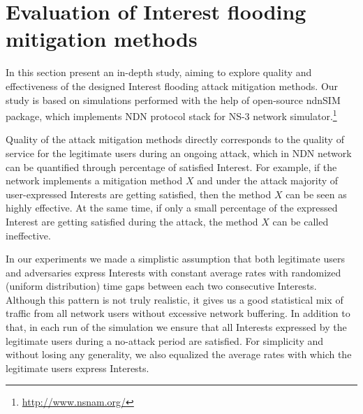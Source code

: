 \section{Evaluation of Interest flooding mitigation methods}
\label{sec:evaluation}




In this section present an in-depth study, aiming to explore quality and effectiveness of the designed Interest flooding attack mitigation methods.
Our study is based on simulations performed with the help of open-source ndnSIM~\cite{ndnsim} package, which implements NDN protocol stack for NS-3 network simulator.\footnote{\url{http://www.nsnam.org/}}


Quality of the attack mitigation methods directly corresponds to the quality of service for the legitimate users during an ongoing attack, which in NDN network can be quantified through percentage of satisfied Interest.
For example, if the network implements a mitigation method $X$ and under the attack majority of user-expressed Interests are getting satisfied, then the method $X$ can be seen as highly effective.
At the same time, if only a small percentage of the expressed Interest are getting satisfied during the attack, the method $X$ can be called ineffective. 


In our experiments we made a simplistic assumption that both legitimate users and adversaries express Interests with constant average rates with randomized (uniform distribution) time gaps between each two consecutive Interests.
Although this pattern is not truly realistic, it gives us a good statistical mix of traffic from all network users without excessive network buffering.
In addition to that, in each run of the simulation we ensure that all Interests expressed by the legitimate users during a no-attack period are satisfied.
For simplicity and without losing any generality, we also equalized the average rates with which the legitimate users express Interests.


